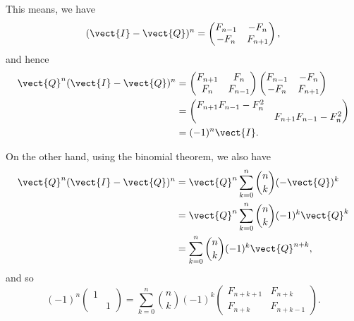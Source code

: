 \begin{enumerate}
\begin{enumerate}
                    This means, we have
                    \[
                        (\vect{I} - \vect{Q})^n = \begin{pmatrix}
                            F_{n - 1} & - F_n \\ - F_n & F_{n + 1}
                        \end{pmatrix},
                    \]
                    and hence
                    \begin{align*}
                        \vect{Q}^n (\vect{I} - \vect{Q})^n & = \begin{pmatrix}
                                                                   F_{n + 1} & F_n \\ F_n & F_{n - 1}
                                                               \end{pmatrix} \begin{pmatrix}
                                                                                 F_{n - 1} & -F_n \\ -F_n & F_{n + 1}
                                                                             \end{pmatrix}             \\
                                                           & = \begin{pmatrix}
                                                                   F_{n + 1} F_{n - 1} - F_n^2 & \\ & F_{n + 1} F_{n - 1} - F_n^2
                                                               \end{pmatrix} \\
                                                           & = (-1)^n \vect{I}.
                    \end{align*}

                    On the other hand, using the binomial theorem, we also have
                    \begin{align*}
                        \vect{Q}^n (\vect{I} - \vect{Q})^n & = \vect{Q}^n \sum_{k = 0}^{n} \binom{n}{k} (-\vect{Q})^k     \\
                                                           & = \vect{Q}^n \sum_{k = 0}^{n} \binom{n}{k} (-1)^k \vect{Q}^k \\
                                                           & = \sum_{k = 0}^{n} \binom{n}{k} (-1)^k \vect{Q}^{n + k},
                    \end{align*}
                    and so
                    \[
                        (-1)^n \begin{pmatrix}
                            1 & \\ & 1
                        \end{pmatrix} = \sum_{k = 0}^{n} \binom{n}{k} (-1)^k \begin{pmatrix}
                            F_{n + k + 1} & F_{n + k} \\ F_{n + k} & F_{n + k - 1}
                        \end{pmatrix}.
                    \]


\end{enumerate}
\end{enumerate}
